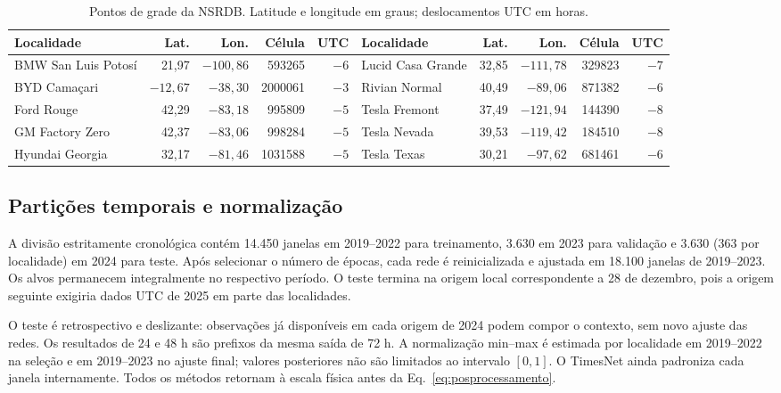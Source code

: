 \documentclass[10pt,conference,a4paper]{IEEEtran}
\begin{document}
\begin{table}[!t]
\centering
\caption{Pontos de grade da NSRDB. Latitude e longitude em graus;
deslocamentos UTC em horas.}
\label{tab:localidades}
\scriptsize
\setlength{\tabcolsep}{2.2pt}
\renewcommand{\arraystretch}{0.96}
\begin{tabular}{lrrrr@{\hspace{7pt}}lrrrr}
\toprule
\textbf{Localidade} & \textbf{Lat.} & \textbf{Lon.} & \textbf{Célula} &
\textbf{UTC} & \textbf{Localidade} & \textbf{Lat.} & \textbf{Lon.} &
\textbf{Célula} & \textbf{UTC} \\
\midrule
BMW San Luis Potosí & 21,97 & $-100,86$ & 593265 & $-6$ &
Lucid Casa Grande & 32,85 & $-111,78$ & 329823 & $-7$ \\
BYD Camaçari & $-12,67$ & $-38,30$ & 2000061 & $-3$ &
Rivian Normal & 40,49 & $-89,06$ & 871382 & $-6$ \\
Ford Rouge & 42,29 & $-83,18$ & 995809 & $-5$ &
Tesla Fremont & 37,49 & $-121,94$ & 144390 & $-8$ \\
GM Factory Zero & 42,37 & $-83,06$ & 998284 & $-5$ &
Tesla Nevada & 39,53 & $-119,42$ & 184510 & $-8$ \\
Hyundai Georgia & 32,17 & $-81,46$ & 1031588 & $-5$ &
Tesla Texas & 30,21 & $-97,62$ & 681461 & $-6$ \\
\bottomrule
\end{tabular}
\end{table}

\subsection{Partições temporais e normalização}

A divisão estritamente cronológica contém 14.450 janelas em 2019--2022 para
treinamento, 3.630 em 2023 para validação e 3.630 (363 por localidade) em 2024
para teste. Após selecionar o número de épocas, cada rede é reinicializada e
ajustada em 18.100 janelas de 2019--2023. Os alvos permanecem integralmente no
respectivo período. O teste termina na origem local correspondente a 28 de dezembro, pois a
origem seguinte exigiria dados UTC de 2025 em parte das localidades.

O teste é retrospectivo e deslizante: observações já disponíveis em cada origem de 2024
podem compor o contexto, sem novo ajuste das redes. Os resultados de 24 e 48 h
são prefixos da mesma saída de 72 h. A normalização min--max é estimada por
localidade em 2019--2022 na seleção e em 2019--2023 no ajuste final; valores
posteriores não são limitados ao intervalo $[0,1]$. O TimesNet ainda padroniza
cada janela internamente. Todos os métodos retornam à escala física antes da
Eq.~\eqref{eq:posprocessamento}.
\end{document}
